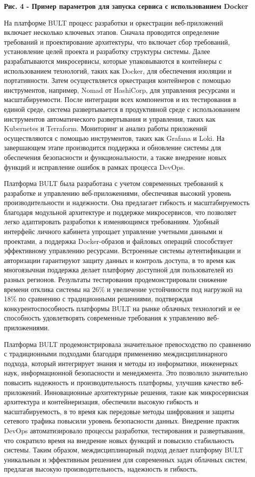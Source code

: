 {{\bfseries Рис. 4 - Пример параметров для запуска сервиса с использованием
Docker}

На платформе BULT процесс разработки и оркестрации веб-приложений
включает несколько ключевых этапов. Сначала проводится определение
требований и проектирование архитектуры, что включает сбор требований,
установление целей проекта и разработку структуры системы. Далее
разрабатываются микросервисы, которые упаковываются в контейнеры с
использованием технологий, таких как Docker, для обеспечения изоляции и
портативности. Затем осуществляется оркестрация контейнеров с помощью
инструментов, например, Nomad от HashiCorp, для управления ресурсами и
масштабируемости. После интеграции всех компонентов и их тестирования в
единой среде, система развертывается в продуктивной среде с
использованием инструментов автоматического развертывания и управления,
таких как Kubernetes и Terraform. Мониторинг и анализ работы приложений
осуществляются с помощью инструментов, таких как Grafana и Loki. На
завершающем этапе производится поддержка и обновление системы для
обеспечения безопасности и функциональности, а также внедрение новых
функций и исправление ошибок в рамках процесса DevOps.

Платформа BULT была разработана с учетом современных требований к
разработке и управлению веб-приложениями, обеспечивая высокий уровень
производительности и надежности. Она предлагает гибкость и
масштабируемость благодаря модульной архитектуре и поддержке
микросервисов, что позволяет легко адаптировать разработки к
изменяющимся требованиям. Удобный интерфейс личного кабинета упрощает
управление учетными данными и проектами, а поддержка Docker-образов и
файловых операций способствует эффективному управлению ресурсами.
Встроенные системы аутентификации и авторизации гарантируют защиту
данных и контроль доступа, в то время как многоязычная поддержка делает
платформу доступной для пользователей из разных регионов. Результаты
тестирования продемонстрировали снижение времени отклика системы на 26\%
и увеличение устойчивости под нагрузкой на 18\% по сравнению с
традиционными решениями, подтверждая конкурентоспособность платформы
BULT на рынке облачных технологий и ее способность удовлетворять
современные требования к управлению веб-приложениями.

Платформа BULT продемонстрировала значительное превосходство по
сравнению с традиционными подходами благодаря применению
междисциплинарного подхода, который интегрирует знания и методы из
информатики, инженерных наук, информационной безопасности и менеджмента.
Это позволило значительно повысить надежность и производительность
платформы, улучшив качество веб-приложений. Инновационные архитектурные
решения, такие как микросервисная архитектура и контейнеризация,
обеспечили высокую гибкость и масштабируемость, в то время как передовые
методы шифрования и защиты сетевого трафика повысили уровень
безопасности данных. Внедрение практик DevOps автоматизировало процессы
разработки, тестирования и развертывания, что сократило время на
внедрение новых функций и повысило стабильность системы. Таким образом,
междисциплинарный подход делает платформу BULT уникальным и эффективным
решением для современных задач облачных систем, предлагая высокую
производительность, надежность и гибкость.

}
